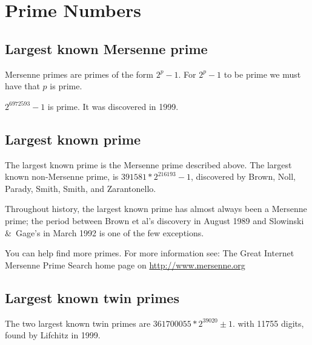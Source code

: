 \section{Prime Numbers}
    
\subsection{Largest known Mersenne prime}

Mersenne primes are primes of the form $2^p-1$. For $2^p-1$ to be prime
we must have that $p$ is prime.

$2^{6972593}-1$ is prime. It was discovered in 1999.
	
\subsection{Largest known prime}

The largest known prime is the Mersenne prime described above.  The
largest known non-Mersenne prime, is $391581*2^{216193}-1$, discovered
by Brown, Noll, Parady, Smith, Smith, and Zarantonello.

Throughout history, the largest known prime has almost always been a
Mersenne prime; the period between Brown et al's discovery in August
1989 and Slowinski \&\ Gage's in March 1992 is one of the few
exceptions.

You can help find more primes. For more information see: The Great
Internet Mersenne Prime Search home page on
\url{http://www.mersenne.org}

\Ref

	
\subsection{Largest known twin primes}


The two largest known twin primes are $361700055 * 2^39020 \pm 1$.  with
11755 digits, found by Lifchitz in 1999.
	
